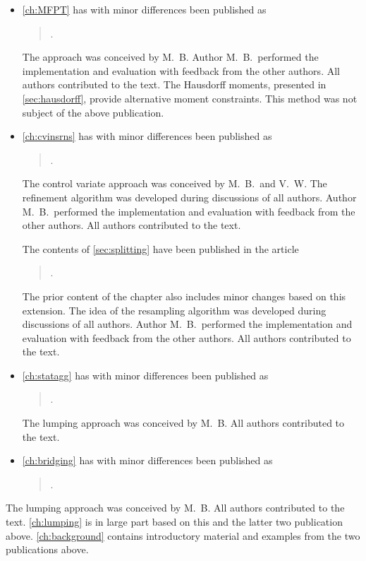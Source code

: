 \begin{itemize}

\item \autoref{ch:MFPT} has with minor differences been published as
\begin{quote}
    .
\end{quote}
The approach was conceived by M.\ B.
Author M.\ B.\ performed the implementation and evaluation with feedback from the other authors.
All authors contributed to the text.
The Hausdorff moments, presented in \autoref{sec:hausdorff}, provide alternative moment constraints.
This method was not subject of the above publication.

\item \autoref{ch:cvinsrns} has with minor differences been published as
\begin{quote}
    .
\end{quote}
The control variate approach was conceived by M.\ B.\ and V.\ W. The refinement algorithm was developed during discussions of all authors.
Author M.\ B.\ performed the implementation and evaluation with feedback from the other authors.
All authors contributed to the text.

The contents of \autoref{sec:splitting} have been published in the article
\begin{quote}
    .
\end{quote}
The prior content of the chapter also includes minor changes based on this extension.
The idea of the resampling algorithm was developed during discussions of all authors.
Author M.\ B.\ performed the implementation and evaluation with feedback from the other authors.
All authors contributed to the text.

\item \autoref{ch:statagg} has with minor differences been published as
\begin{quote}
    .
\end{quote}
The lumping approach was conceived by M.\ B.
All authors contributed to the text.

\item \autoref{ch:bridging} has with minor differences been published as
\begin{quote}
    .
\end{quote}
\end{itemize}
The lumping approach was conceived by M.\ B.
All authors contributed to the text.
\autoref{ch:lumping} is in large part based on this and the latter two publication above.
\autoref{ch:background} contains introductory material and examples from the two publications above.


